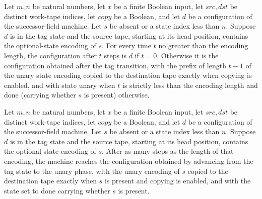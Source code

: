 \begin{lemma}
\label{Turing.StepBlock.succFieldTM_trace}
\leanok
{}
Let $m,n$ be natural numbers, let $x$ be a finite Boolean input, let $src,dst$ be
distinct work-tape indices, let $copy$ be a Boolean, and let $d$ be a configuration of
the successor-field machine. Let $s$ be absent or a state index less than $n$. Suppose
$d$ is in the tag state and the source tape, starting at its head position, contains the
optional-state encoding of $s$. For every time $t$ no greater than the encoding length,
the configuration after $t$ steps is $d$ if $t=0$. Otherwise it is the configuration
obtained after the tag transition, with the prefix of length $t-1$ of the unary state
encoding copied to the destination tape exactly when copying is enabled, and with state
unary when $t$ is strictly less than the encoding length and done (carrying whether $s$
is present) otherwise.
\end{lemma}

\begin{lemma}
\label{Turing.StepBlock.succFieldTM_run}
\leanok
{}
Let $m,n$ be natural numbers, let $x$ be a finite Boolean input, let $src,dst$ be
distinct work-tape indices, let $copy$ be a Boolean, and let $d$ be a configuration of
the successor-field machine. Let $s$ be absent or a state index less than $n$. Suppose
$d$ is in the tag state and the source tape, starting at its head position, contains the
optional-state encoding of $s$. After as many steps as the length of that encoding, the
machine reaches the configuration obtained by advancing from the tag state to the unary
phase, with the unary encoding of $s$ copied to the destination tape exactly when $s$ is
present and copying is enabled, and with the state set to done carrying whether $s$ is
present.
\end{lemma}


